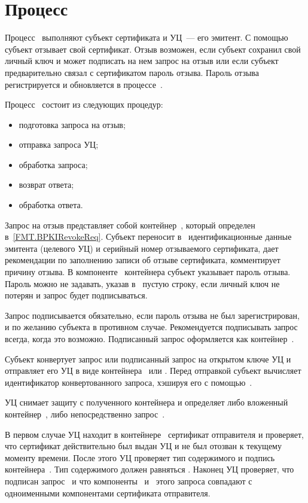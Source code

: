 \section{Процесс }\label{PROCESSES.Revoke}

Процесс~ выполняют субъект сертификата и УЦ~--- его эмитент. С
помощью~ субъект отзывает свой сертификат. Отзыв возможен, если
субъект сохранил свой личный ключ и может подписать на нем запрос на отзыв или
если субъект предварительно связал с сертификатом пароль отзыва. Пароль отзыва
регистрируется и обновляется в процессе~.

Процесс~ состоит из следующих процедур:
\begin{itemize}
\item
подготовка запроса на отзыв;
\item
отправка запроса УЦ;
\item
обработка запроса;
\item
возврат ответа;
\item
обработка ответа.
\end{itemize}

Запрос на отзыв представляет собой контейнер~, который
определен в~\ref{FMT.BPKIRevokeReq}. Субъект переносит в~
идентификационные данные эмитента (целевого УЦ) и серийный номер отзываемого
сертификата, дает рекомендации по  заполнению записи об отзыве сертификата,
комментирует причину отзыва. В компоненте~ контейнера субъект
указывает пароль отзыва.
%
Пароль можно не задавать, указав в~ пустую строку, если личный
ключ не потерян и запрос будет подписываться.

Запрос подписывается обязательно, если пароль отзыва не был зарегистрирован, и
по желанию субъекта в противном случае.
%
Рекомендуется подписывать запрос всегда, когда это возможно.
%
Подписанный запрос оформляется как контейнер~.

Субъект конвертует запрос или подписанный запрос на открытом ключе УЦ и
отправляет его УЦ в виде контейнера~ или 
. Перед отправкой субъект вычисляет идентификатор 
конвертованного запроса, хэшируя его с помощью~.

УЦ снимает защиту с полученного контейнера и определяет либо вложенный 
контейнер~, либо непосредственно запрос~.

В первом случае УЦ находит в контейнере~ сертификат отправителя
и проверяет, что сертификат действительно был выдан УЦ и не был отозван к
текущему моменту времени. После этого УЦ проверяет тип содержимого и подпись
контейнера~. Тип содержимого должен равняться
. Наконец УЦ проверяет, что  подписан
запрос~ и что компоненты~ и~
этого запроса совпадают с одноименными компонентами сертификата отправителя.

